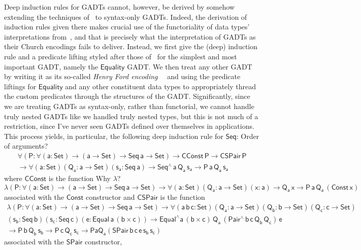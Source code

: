\documentclass[9pt]{entcs}
\begin{document}
Deep induction rules for GADTs cannot, however, be derived by somehow
extending the techniques of~\cite{jp20} to syntax-only GADTs. Indeed,
the derivation of induction rules given there makes crucial use of the
functoriality of data types' interpretations from~\cite{jp19}, and
that is precisely what the interpretation of GADTs as their Church
encodings fails to deliver. Instead, we first give the (deep)
induction rule and a predicate lifting styled after those
of~\cite{jp20} for the simplest and most important GADT, namely the
$\mathsf{Equality}$ GADT. We then treat any other GADT by writing it
as its so-called {\em Henry Ford
  encoding}~~\cite{ch03,hin03,mcb99,sjsv09,sp04} and using the
predicate liftings for $\mathsf{Equality}$ and any other constituent
data types to appropriately thread the custom predicates through the
structures of the GADT. {\color{red} Significantly, since we are
  treating GADTs as syntax-only, rather than functorial, we cannot
  handle truly nested GADTs like we handled truly nested types, but
  this is not much of a restriction, since I've never seen GADTs
  defined over themselves in applications.} This process yields, in
particular, the following deep induction rule for $\mathsf{Seq}$:
{\color{red} Order of arguments?}
\begin{multline*}
\mathsf{\forall (P : \forall (a : Set) \to (a \to Set) \to Seq\,a \to
  Set)} \mathsf{\to CConst\,P \to CSPair\,P} \\ \mathsf{\to \forall (a
  : Set)(Q_a : a \to Set)(s_a : Seq\,a) \to Seq^{\wedge}\,a\,Q_a\,s_a
  \to P\,a\,Q_a\,s_a}
\end{multline*}
where $\mathsf{CConst}$ is the function {\color{red} Why $\lambda$?}
\[\mathsf{\lambda (P : \forall (a : Set) \to (a \to Set) \to Seq\,a \to Set)} 
\mathsf{\to \forall (a : Set) (Q_a : a \to Set) (x : a) \to Q_a\,x \to
  P\,a\,Q_a\,(Const\,x)}
\]
associated with the $\mathsf{Const}$ constructor and $\mathsf{CSPair}$
is the function
\begin{multline*}
\mathsf{\lambda (P : \forall (a : Set) \to (a \to Set) \to Seq\,a \to Set)}
\mathsf{\to \forall (a\,b\,c : Set)
	(Q_a : a \to Set) (Q_b : b \to Set) (Q_c : c \to Set)} \\
	\mathsf{(s_b : Seq\,b) (s_c : Seq\,c) (e : Equal\,a\,(b \times c))
	\to Equal^{\wedge} a\, (b \times c)\, Q_a\, (Pair^{\wedge}\,b\,c\,Q_b\,Q_c)\, e} \\
	\mathsf{\to P\,b\,Q_b\,s_b \to P\,c\,Q_c\,s_c
	\to P a Q_a ( SPair\,b\,c\,e\,s_b\,s_c )}
\end{multline*}
associated with the $\mathsf{SPair}$ constructor,
\end{document}
